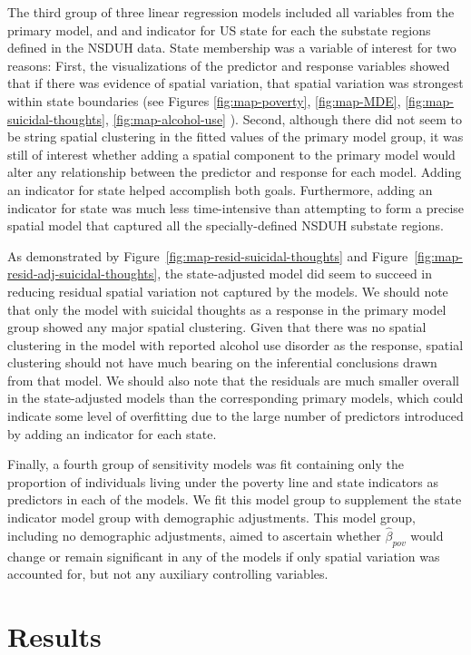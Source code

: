 \documentclass{article}
\begin{document}
The third group of three linear regression models included all variables
from the primary model,
and and indicator for US state for each the
substate regions defined in the NSDUH data.
State membership was a variable of interest for two
reasons:
First, the visualizations of the predictor and response variables
showed that if there was evidence of spatial variation,
that spatial variation was strongest within state boundaries
(see Figures
\ref{fig:map-poverty},
\ref{fig:map-MDE},
\ref{fig:map-suicidal-thoughts},
\ref{fig:map-alcohol-use}
).
Second, although there did not seem to be string spatial
clustering in the fitted values of the primary model group,
it was still of interest whether adding a spatial component to
the primary model would alter any relationship between
the predictor and response for each model.
Adding an indicator for state helped accomplish both goals.
Furthermore, adding an indicator for state was much less
time-intensive than attempting to form a precise spatial model
that captured all the specially-defined NSDUH substate regions.

As demonstrated by
Figure~\ref{fig:map-resid-suicidal-thoughts}
and Figure~\ref{fig:map-resid-adj-suicidal-thoughts},
the state-adjusted model did seem to succeed in
reducing residual spatial variation
not captured by the models.
We should note that only the model with suicidal
thoughts as a response in the primary model group
showed any major spatial clustering.
Given that there was no spatial clustering in
the model with reported alcohol use disorder as the response,
spatial clustering should not have much
bearing on the inferential conclusions drawn from that model.
We should also note that the residuals
are much smaller overall in the state-adjusted
models than the corresponding primary models,
which could indicate some level of overfitting due
to the large number of predictors
introduced by adding an indicator for each state.

Finally, a fourth group of sensitivity models was fit
containing only the proportion of individuals living
under the poverty line and state indicators as predictors
in each of the models.
We fit this model group to supplement the state indicator
model group with demographic adjustments.
This model group, including no demographic adjustments,
aimed to ascertain whether
$\hat{\beta}_{pov}$ would change or remain significant
in any of the models
if only spatial variation was accounted for,
but not any auxiliary controlling variables.

\section{Results}
\end{document}
